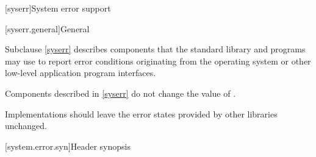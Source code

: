 [syserr]{System error support}

[syserr.general]{General}

\pnum
Subclause \ref{syserr} describes components that the standard library and
\Cpp{} programs may use to report error conditions originating from
the operating system or other low-level application program interfaces.

\pnum
Components described in \ref{syserr} do not change the value of
.

\recommended
Implementations should leave the error states provided by other
libraries unchanged.

[system.error.syn]{Header  synopsis}

%
%
%
%
%
